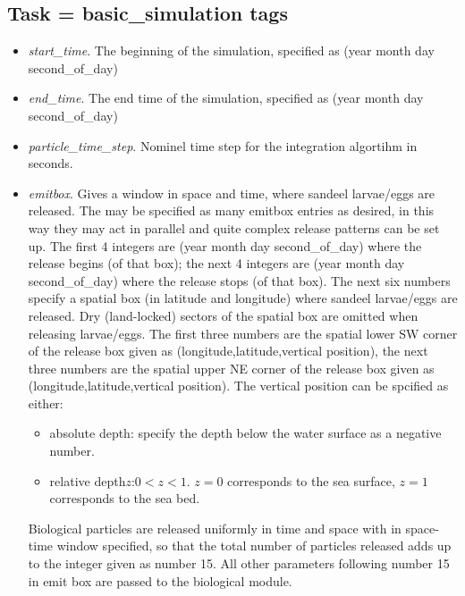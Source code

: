 \subsection{Task = basic\_simulation tags}
\begin{itemize}
  \item {\em start\_time}. The beginning of the simulation, specified as (year  month  day  second\_of\_day)
  \item {\em end\_time}. The end time of the simulation, specified as (year  month  day  second\_of\_day) 
  \item {\em particle\_time\_step}. Nominel time step for the integration algortihm 
        in seconds.
  \item {\em emitbox}. Gives a window in space and time, where sandeel larvae/eggs are released.
        The may be specified as many emitbox entries as desired, in this way they
        may act in parallel and quite complex release patterns can be set up.
        The first 4 integers are (year  month  day  second\_of\_day) where the release
        begins (of that box); the next 4 integers are (year  month  day  second\_of\_day) where the release
        stops (of that box). 
        The next six numbers specify a spatial box (in latitude and longitude) where
        sandeel larvae/eggs are released. Dry (land-locked) sectors of the spatial box are omitted when
        releasing larvae/eggs. The first three numbers are the spatial lower SW corner of the release box
        given as (longitude,latitude,vertical position), the next three numbers are the spatial upper 
        NE corner of the release box given as (longitude,latitude,vertical position).
        The vertical position can be spcified as either:
        \begin{itemize}
            \item absolute depth: specify the depth below the water surface as a negative number.
            \item relative depth$z$:$ 0 < z < 1$. 
        $z=0$ corresponds to the sea surface, 
        $z=1$ corresponds to the sea bed.
        \end{itemize}
        Biological particles are released uniformly in time and space with in space-time window
        specified, so that the total number of particles released adds up to the integer given as 
        number 15. All other parameters following number 15 in emit box are passed to the biological module.
\end{itemize}
